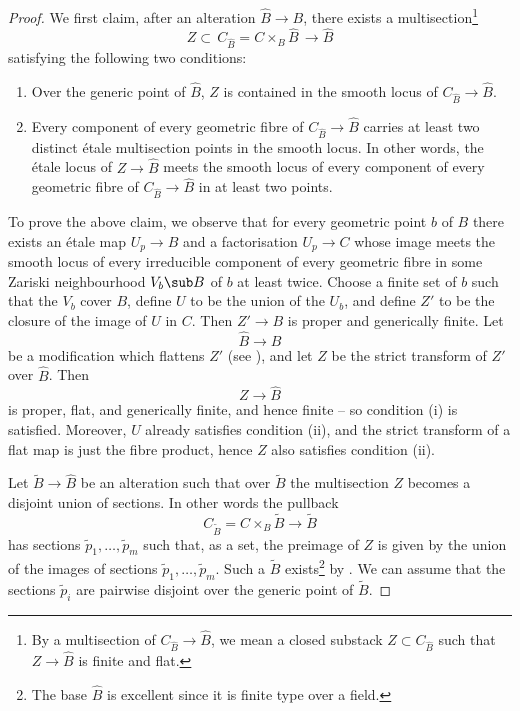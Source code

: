\begin{proof}
We first claim, after an alteration %
$\widehat{B}\to B$,
there exists a multisection\footnote{By a multisection of $C_{\widehat{B}}\to \widehat{B}$,
we mean a closed substack $Z \subset C_{\widehat{B}}$ such that $Z \to \widehat{B}$ is finite and flat.}
$$Z \subset \, C_{\widehat{B}}=C\times_B \widehat{B}\,  \to \widehat{B}$$ satisfying the following
two conditions:
\begin{enumerate}[label=\roman*)]
    \item[(i)] Over the generic point of $\widehat{B}$, $Z$ is contained in the smooth locus of $C_{\widehat{B}} \to \widehat{B}$.
    \item[(ii)] Every component of every geometric fibre of $C_{\widehat{B}}\to \widehat{B}$  carries at least two  distinct \'etale multisection points in the smooth locus. In other words, the \'etale locus of $Z \to \widehat{B}$ meets the smooth locus of every component of every geometric fibre of $C_{\widehat{B}} \to \widehat{B}$ in at least two points.
\end{enumerate}
To prove the above claim, we observe that for every geometric point $b$ of $B$ there exists an \'etale map $U_p \to B$ and a factorisation $U_p \to C$ whose image meets
the smooth locus of every irreducible component of every geometric fibre in some Zariski neighbourhood $V_b\sub B$ of $b$ at least twice. Choose a finite set of $b$ such that the $V_b$ cover $B$, define $U$ to be the union of the $U_b$, and define $Z'$ to be the closure of the image of $U$ in $C$.  Then $Z' \to B$ is proper and generically finite.
Let $$\widehat B \to B$$
be a modification which flattens $Z'$ (see \cite{Raynaud-Gruson}), and let $Z$ be the strict transform of $Z'$ over $\widehat B$. Then $$Z \to \widehat B$$
is proper, flat, and generically finite, and hence  finite -- so condition (i) is
satisfied. Moreover, $U$ already satisfies condition (ii), and the strict transform of a flat map is just the fibre product, hence $Z$ also satisfies condition (ii).

Let $\widetilde B \to \widehat B$ be an alteration such that over $\widetilde B$ the multisection $Z$ becomes a disjoint union of sections.
In other words the pullback
$$C_{\widetilde{B}}= C \times_B \widetilde B \to \widetilde B$$
has sections $\widetilde p_1, \ldots, \widetilde p_m$ such that, as a set,
the preimage of $Z$ is given by the union of the images of sections $\widetilde p_1, \ldots, \widetilde p_m$. Such a $\widetilde B$ exists{\footnote{The base $\widehat B$ is excellent since it is finite type over a field.}}
by \cite[Lemma 5.6]{Jong1996Smoothness-semi}.
We can assume that the sections $\widetilde p_i$ are pairwise disjoint over the generic point of $\widetilde B$.


\end{proof}
